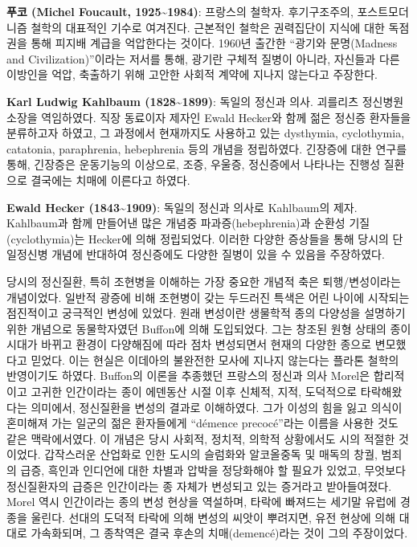 \documentclass[
]{article}
\begin{document}
\textbf{푸코 (Michel Foucault, 1925\textasciitilde1984)}: 프랑스의
철학자. 후기구조주의, 포스트모더니즘 철학의 대표적인 기수로 여겨진다.
근본적인 철학은 권력집단이 지식에 대한 독점권을 통해 피지배 계급을
억압한다는 것이다. 1960년 출간한 ``광기와 문명(Madness and
Civilization)''이라는 저서를 통해, 광기란 구체적 질병이 아니라, 자신들과
다른 이방인을 억압, 축출하기 위해 고안한 사회적 계약에 지나지 않는다고
주장한다.

\textbf{Karl Ludwig Kahlbaum (1828\textasciitilde1899)}: 독일의 정신과
의사. 괴를리츠 정신병원 소장을 역임하였다. 직장 동료이자 제자인 Ewald
Hecker와 함께 젊은 정신증 환자들을 분류하고자 하였고, 그 과정에서
현재까지도 사용하고 있는 dysthymia, cyclothymia, catatonia, paraphrenia,
hebephrenia 등의 개념을 정립하였다. 긴장증에 대한 연구를 통해, 긴장증은
운동기능의 이상으로, 조증, 우울증, 정신증에서 나타나는 진행성 질환으로
결국에는 치매에 이른다고 하였다.

\textbf{Ewald Hecker (1843\textasciitilde1909)}: 독일의 정신과 의사로
Kahlbaum의 제자. Kahlbaum과 함께 만들어낸 많은 개념중
파과증(hebephrenia)과 순환성 기질(cyclothymia)는 Hecker에 의해
정립되었다. 이러한 다양한 증상들을 통해 당시의 단일정신병 개념에
반대하여 정신증에도 다양한 질병이 있을 수 있음을 주장하였다.

당시의 정신질환, 특히 조현병을 이해하는 가장 중요한 개념적 축은
퇴행/변성이라는 개념이었다. 일반적 광증에 비해 조현병이 갖는 두드러진
특색은 어린 나이에 시작되는 점진적이고 궁극적인 변성에 있었다. 원래
변성이란 생물학적 종의 다양성을 설명하기 위한 개념으로 동물학자였던
Buffon에 의해 도입되었다. 그는 창조된 원형 상태의 종이 시대가 바뀌고
환경이 다양해짐에 따라 점차 변성되면서 현재의 다양한 종으로 변모했다고
믿었다. 이는 현실은 이데아의 불완전한 모사에 지나지 않는다는 플라톤
철학의 반영이기도 하였다. Buffon의 이론을 추종했던 프랑스의 정신과 의사
Morel은 합리적이고 고귀한 인간이라는 종이 에덴동산 시절 이후 신체적,
지적, 도덕적으로 타락해왔다는 의미에서, 정신질환을 변성의 결과로
이해하였다. 그가 이성의 힘을 잃고 의식이 혼미해져 가는 일군의 젊은
환자들에게 ``démence precocé''라는 이름을 사용한 것도 같은 맥락에서였다.
이 개념은 당시 사회적, 정치적, 의학적 상황에서도 시의 적절한 것이었다.
갑작스러운 산업화로 인한 도시의 슬럼화와 알코올중독 및 매독의 창궐,
범죄의 급증, 흑인과 인디언에 대한 차별과 압박을 정당화해야 할 필요가
있었고, 무엇보다 정신질환자의 급증은 인간이라는 종 자체가 변성되고 있는
증거라고 받아들여졌다. Morel 역시 인간이라는 종의 변성 현상을 역설하며,
타락에 빠져드는 세기말 유럽에 경종을 울린다. 선대의 도덕적 타락에 의해
변성의 씨앗이 뿌려지면, 유전 현상에 의해 대대로 가속화되며, 그 종착역은
결국 후손의 치매(demencé)라는 것이 그의 주장이었다.
\end{document}
